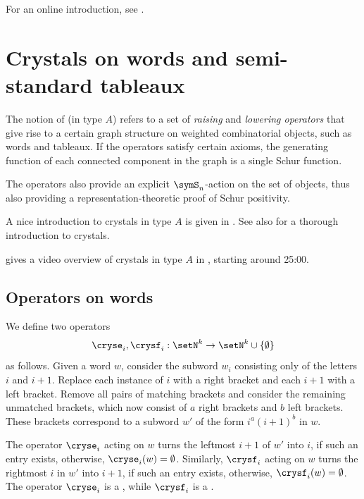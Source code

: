 
For an online introduction, see \cite{StanfordCrystalsIntro}.

\section[crystals]{Crystals on words and semi-standard tableaux}

The notion of \label{crystalDefinition} (in type $A$) refers to
a set of \emph{raising} and \emph{lowering operators} that give rise to a
certain graph structure on weighted combinatorial objects, such as words and
tableaux.  If the operators satisfy certain axioms, the generating function of
each connected component in the graph is a single Schur function.

The operators also provide an explicit $\symS_n$-action on the set of objects,
thus also providing a representation-theoretic proof of Schur positivity.

A nice introduction to crystals in type $A$ is given in \cite{Shimozono2005}.
See also \cite{BumpSchilling2017} for a thorough introduction to crystals.

 gives a video overview of crystals in type $A$ in
\cite{Blasiak2020CrystalGraphsVideo}, starting around 25:00.

\subsection[crystalOperators]{Operators on words}

We define two operators
\[
  \cryse_i, \crysf_i : \setN^k \to \setN^k \cup \{ \emptyset \}
\]
as follows.
Given a word $w$, consider the subword $w_i$ consisting only of the letters
$i$ and $i+1$.
Replace each instance of $i$ with a right bracket and each $i+1$ with a left bracket.
Remove all pairs of matching brackets and consider the remaining unmatched brackets,
which now consist of $a$ right brackets and $b$ left brackets.
These brackets correspond to a subword $w'$ of the form $i^a (i+1)^b$ in $w$.

The operator $\cryse_i$ acting on $w$ turns the leftmost $i+1$ of $w'$ into $i$,
if such an entry exists, otherwise, $\cryse_i(w)=\emptyset$.
Similarly, $\crysf_i$ acting on $w$ turns the rightmost $i$ in $w'$ into $i+1$,
if such an entry exists, otherwise, $\crysf_i(w)=\emptyset$.
The operator $\cryse_i$ is a
\label{crystalRaisingOperator},
while $\crysf_i$ is a
\label{crystalLoweringOperator}.


